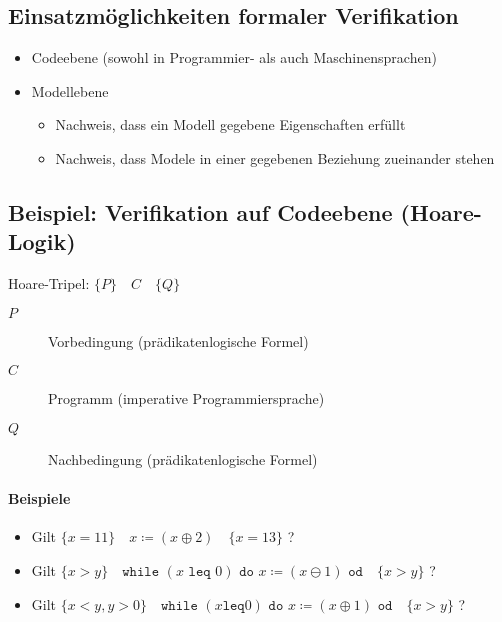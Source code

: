 	    \subsection{Einsatzmöglichkeiten formaler Verifikation}
		    \begin{itemize}
		    	\item Codeebene (sowohl in Programmier- als auch Maschinensprachen)
			    \item Modellebene
				    \begin{itemize}
				    	\item Nachweis, dass ein Modell gegebene Eigenschaften erfüllt
				    	\item Nachweis, dass Modele in einer gegebenen Beziehung zueinander stehen
				    \end{itemize}
		    \end{itemize}
	    
	    \subsection{Beispiel: Verifikation auf Codeebene (Hoare-Logik)}
		    Hoare-Tripel: $ \{ P \} \quad C \quad \{ Q \} $
		    \begin{description}
		    	\item[$ P $] Vorbedingung (prädikatenlogische Formel)
		    	\item[$ C $] Programm (imperative Programmiersprache)
		    	\item[$ Q $] Nachbedingung (prädikatenlogische Formel)
		    \end{description}
		    
		    \paragraph{Beispiele}
			    \begin{itemize}
			    	\item Gilt $ \{ x = 11 \} \quad x \coloneqq (x \oplus 2) \quad \{ x = 13 \} $ ?
			    	\item Gilt $ \{ x > y \} \quad \texttt{while } (x \texttt{ leq } 0) \texttt{ do } x \coloneqq (x \ominus 1) \texttt{ od} \quad \{ x > y \} $ ?
			    	\item Gilt $ \{ x < y, y > 0 \} \quad \texttt{while } (x \texttt{leq} 0) \texttt{ do } x \coloneqq (x \oplus 1) \texttt{ od} \quad \{ x > y \} $ ?
			    \end{itemize}

